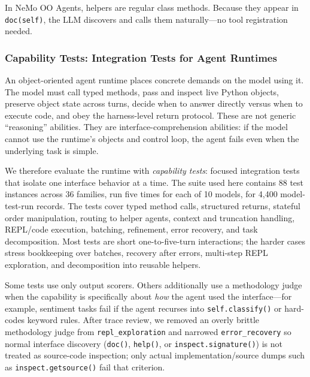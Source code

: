 \documentclass[11pt, logo, onecolumn, copyright, colorlinks=true, allcolors=blue]{nvidiatechreport}
\begin{document}
In NeMo OO Agents, helpers are regular class methods. Because they appear in
\texttt{doc(self)}, the LLM discovers and calls them naturally---no tool
registration needed.

\subsubsection{Capability Tests: Integration Tests for Agent Runtimes}
\label{sec:helpers:captests}

An object-oriented agent runtime places concrete demands on the model using it.
The model must call typed methods, pass and inspect live Python objects, preserve
object state across turns, decide when to answer directly versus when to execute
code, and obey the harness-level return protocol. These are not generic
``reasoning'' abilities. They are interface-comprehension abilities: if the model
cannot use the runtime's objects and control loop, the agent fails even when the
underlying task is simple.

We therefore evaluate the runtime with \emph{capability tests}: focused
integration tests that isolate one interface behavior at a time. The suite used
here contains 88 test instances across 36 families, run five times for each of
10 models, for 4,400 model-test-run records. The tests cover typed method calls,
structured returns, stateful order manipulation, routing to helper agents,
context and truncation handling, REPL/code execution, batching, refinement,
error recovery, and task decomposition. Most tests are short one-to-five-turn
interactions; the harder cases stress bookkeeping over batches, recovery after
errors, multi-step REPL exploration, and decomposition into reusable helpers.

Some tests use only output scorers. Others additionally use a methodology judge
when the capability is specifically about \emph{how} the agent used the
interface---for example, sentiment tasks fail if the agent recurses into
\texttt{self.classify()} or hard-codes keyword rules. After trace review, we
removed an overly brittle methodology judge from \texttt{repl\_exploration} and
narrowed \texttt{error\_recovery} so normal interface discovery
(\texttt{doc()}, \texttt{help()}, or \texttt{inspect.signature()}) is not treated
as source-code inspection; only actual implementation/source dumps such as
\texttt{inspect.getsource()} fail that criterion.
\end{document}
